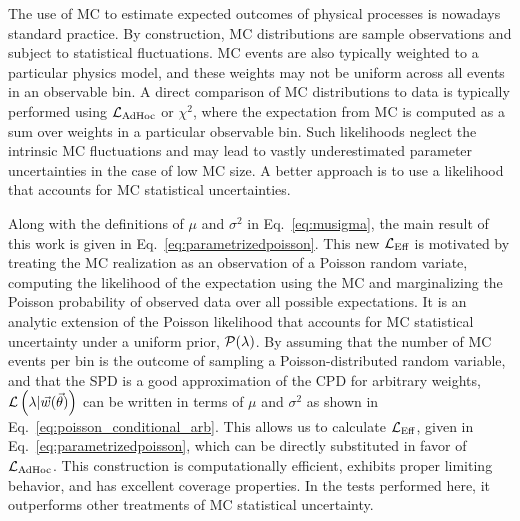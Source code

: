 The use of MC to estimate expected outcomes of physical processes is nowadays standard practice.
By construction, MC distributions are sample observations and subject to statistical fluctuations.
MC events are also typically weighted to a particular physics model, and these weights may not be uniform across all events in an observable bin.
A direct comparison of MC distributions to data is typically performed using $\mathcal{L}_{\textmd{AdHoc}}$ or $\chi^2$, where the expectation from MC is computed as a sum over weights in a particular observable bin.
Such likelihoods neglect the intrinsic MC fluctuations and may lead to vastly underestimated parameter uncertainties in the case of low MC size.
A better approach is to use a likelihood that accounts for MC statistical uncertainties.

Along with the definitions of $\mu$ and $\sigma^2$ in Eq.~\eqref{eq:musigma}, the main result of this work is given in Eq.~\eqref{eq:parametrizedpoisson}.
This new $\mathcal{L}_\textmd{Eff}$ is motivated by treating the MC realization as an observation of a Poisson random variate, computing the likelihood of the expectation using the MC and marginalizing the Poisson probability of observed data over all possible expectations.
It is an analytic extension of the Poisson likelihood that accounts for MC statistical uncertainty under a uniform prior, $\mathcal{P}(\lambda)$.
By assuming that the number of MC events per bin is the outcome of sampling a Poisson-distributed random variable, and that the SPD is a good approximation of the CPD for arbitrary weights, $\mathcal{L} \left(\lambda|\vec{w}(\vec{\theta})\right)$ can be written in terms of $\mu$ and $\sigma^2$ as shown in Eq.~\eqref{eq:poisson_conditional_arb}.
This allows us to calculate $\mathcal{L}_\textmd{Eff}$, given in Eq.~\eqref{eq:parametrizedpoisson}, which can be directly substituted in favor of $\mathcal{L}_{\textmd{AdHoc}}$.
This construction is computationally efficient, exhibits proper limiting behavior, and has excellent coverage properties.
In the tests performed here, it outperforms other treatments of MC statistical uncertainty.
